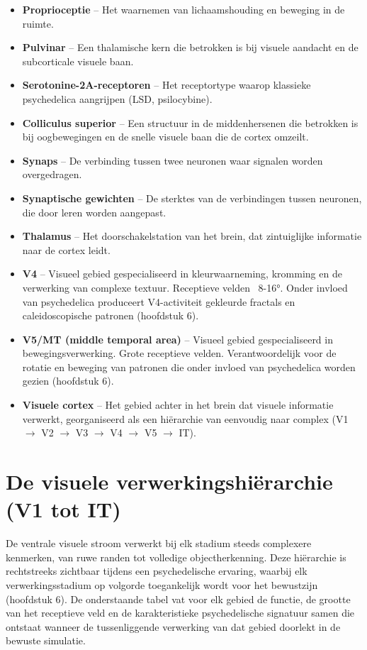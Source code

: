 \documentclass[11pt, twoside, openright]{book}
\begin{document}
\begin{itemize}
  \item \textbf{Proprioceptie} -- Het waarnemen van lichaamshouding en beweging in de ruimte.
  \item \textbf{Pulvinar} -- Een thalamische kern die betrokken is bij visuele aandacht en de subcorticale visuele baan.
  \item \textbf{Serotonine-2A-receptoren} -- Het receptortype waarop klassieke psychedelica aangrijpen (LSD, psilocybine).
  \item \textbf{Colliculus superior} -- Een structuur in de middenhersenen die betrokken is bij oogbewegingen en de snelle visuele baan die de cortex omzeilt.
  \item \textbf{Synaps} -- De verbinding tussen twee neuronen waar signalen worden overgedragen.
  \item \textbf{Synaptische gewichten} -- De sterktes van de verbindingen tussen neuronen, die door leren worden aangepast.
  \item \textbf{Thalamus} -- Het doorschakelstation van het brein, dat zintuiglijke informatie naar de cortex leidt.
  \item \textbf{V4} -- Visueel gebied gespecialiseerd in kleurwaarneming, kromming en de verwerking van complexe textuur. Receptieve velden ~8-16°. Onder invloed van psychedelica produceert V4-activiteit gekleurde fractals en caleidoscopische patronen (hoofdstuk 6).
  \item \textbf{V5/\allowbreak{}MT (middle temporal area)} -- Visueel gebied gespecialiseerd in bewegingsverwerking. Grote receptieve velden. Verantwoordelijk voor de rotatie en beweging van patronen die onder invloed van psychedelica worden gezien (hoofdstuk 6).
  \item \textbf{Visuele cortex} -- Het gebied achter in het brein dat visuele informatie verwerkt, georganiseerd als een hiërarchie van eenvoudig naar complex (V1 $\rightarrow$ V2 $\rightarrow$ V3 $\rightarrow$ V4 $\rightarrow$ V5 $\rightarrow$ IT).
\end{itemize}

\section*{De visuele verwerkingshiërarchie (V1 tot IT)}

De ventrale visuele stroom verwerkt bij elk stadium steeds complexere kenmerken, van ruwe randen tot volledige objectherkenning. Deze hiërarchie is rechtstreeks zichtbaar tijdens een psychedelische ervaring, waarbij elk verwerkingsstadium op volgorde toegankelijk wordt voor het bewustzijn (hoofdstuk 6). De onderstaande tabel vat voor elk gebied de functie, de grootte van het receptieve veld en de karakteristieke psychedelische signatuur samen die ontstaat wanneer de tussenliggende verwerking van dat gebied doorlekt in de bewuste simulatie.
\end{document}
